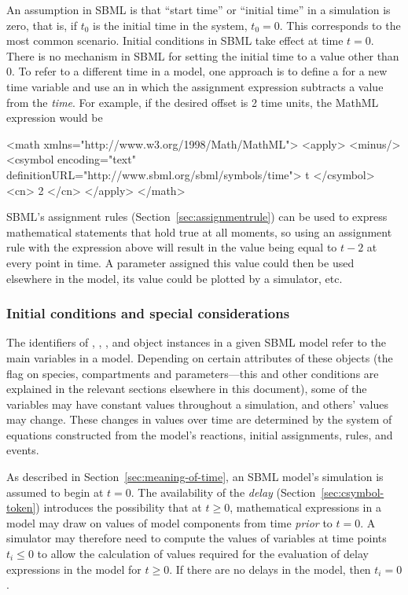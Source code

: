 An assumption in SBML is that ``start time'' or ``initial time''
in a simulation is zero, that is, if $t_0$ is the initial time in
the system, $t_0 = 0$.  This corresponds to the most common
scenario.  Initial conditions in SBML take effect at time $t = 0$.
There is no mechanism in SBML for setting the initial time to a
value other than 0.  To refer to a different time in a model, one
approach is to define a \Parameter for a new time variable and use
an \AssignmentRule in which the assignment expression subtracts a
value from the  \emph{time}.  For example, if the
desired offset is 2 time units, the MathML expression would be

\begin{example}
<math xmlns="http://www.w3.org/1998/Math/MathML">
    <apply>
        <minus/>
        <csymbol encoding="text" definitionURL="http://www.sbml.org/sbml/symbols/time"> t
        </csymbol>
        <cn> 2 </cn>
    </apply>
</math>
\end{example}

SBML's assignment rules (Section~\ref{sec:assignmentrule}) can be
used to express mathematical statements that hold true at all
moments, so using an assignment rule with the expression above
will result in the value being equal to $t - 2$ at every point in
time.  A parameter assigned this value could then be used
elsewhere in the model, its value could be plotted by a simulator,
etc.


\subsubsection{Initial conditions and special considerations}
\label{sec:before-t0}

The identifiers of \Species, \Compartment, \Parameter, and
\Reaction object instances in a given SBML model refer to the main
variables in a model.  Depending on certain attributes of these
objects (\eg the  flag on species, compartments
and parameters---this and other conditions are explained in the
relevant sections elsewhere in this document), some of the
variables may have constant values throughout a simulation, and
others' values may change.  These changes in values over time are
determined by the system of equations constructed from the model's
reactions, initial assignments, rules, and events.

As described in Section~\ref{sec:meaning-of-time}, an SBML model's
simulation is assumed to begin at $t = 0$.  The availability of
the \emph{delay}  (Section~\ref{sec:csymbol-token})
introduces the possibility that at $t \geq 0$, mathematical
expressions in a model may draw on values of model components from
time \emph{prior} to $t = 0$.  A simulator may therefore need to
compute the values of variables at time points $t_i \leq 0$ to
allow the calculation of values required for the evaluation of
delay expressions in the model for $t \geq 0$.  If there are no
delays in the model, then $t_i = 0$.

